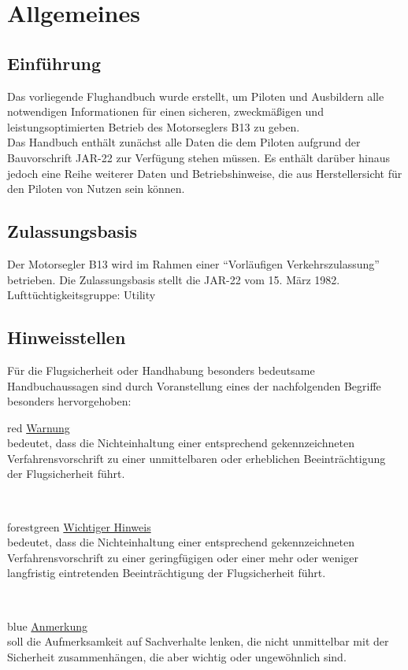 \chapter{Allgemeines}
\section{Einführung}
Das vorliegende Flughandbuch wurde erstellt, um Piloten und Ausbildern alle notwendigen Informationen für einen sicheren, zweckmäßigen und leistungsoptimierten Betrieb des Motorseglers B13 zu geben.\\
\newline
Das Handbuch enthält zunächst alle Daten die dem Piloten aufgrund der Bauvorschrift JAR-22 zur Verfügung stehen müssen. Es enthält darüber hinaus jedoch eine Reihe weiterer Daten und Betriebshinweise, die aus Herstellersicht für den Piloten von Nutzen sein können.

\section{Zulassungsbasis}
Der Motorsegler B13 wird im Rahmen einer "`Vorläufigen Verkehrszulassung"' betrieben. Die Zulassungsbasis stellt die JAR-22 vom 15. März 1982.\\
\newline
Lufttüchtigkeitsgruppe: Utility
\newpage
\section{Hinweisstellen}
Für die Flugsicherheit oder Handhabung besonders bedeutsame Handbuchaussagen sind durch Voranstellung eines der nachfolgenden Begriffe besonders hervorgehoben:\\
\newline
\newline
\begin{color}{red}
\large{\underline{Warnung}}\\
bedeutet, dass die Nichteinhaltung einer entsprechend gekennzeichneten Verfahrensvorschrift zu einer unmittelbaren oder erheblichen Beeinträchtigung der Flugsicherheit führt.
\end{color}\\
\newline
\begin{color}{forestgreen}
\large{\underline{Wichtiger Hinweis}}\\
bedeutet, dass die Nichteinhaltung einer entsprechend gekennzeichneten Verfahrensvorschrift zu einer geringfügigen oder einer mehr oder weniger langfristig eintretenden Beeinträchtigung der Flugsicherheit führt.
\end{color}\\
\newline
\begin{color}{blue}
\large{\underline{Anmerkung}}\\
soll die Aufmerksamkeit auf Sachverhalte lenken, die nicht unmittelbar mit der Sicherheit zusammenhängen, die aber wichtig oder ungewöhnlich sind.
\end{color}

